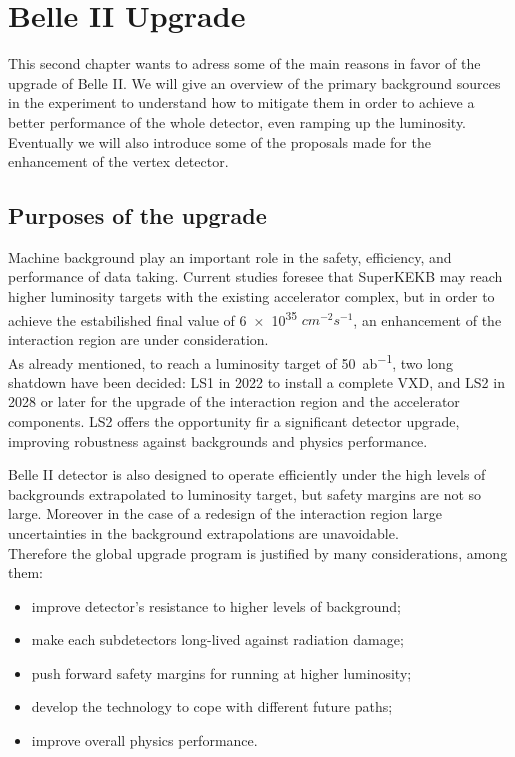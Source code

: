 \chapter{Belle II Upgrade} \label{ch:upgrade}

This second chapter wants to adress some of the main reasons in favor of the upgrade of Belle II. We will give an overview of the primary background sources in the experiment to understand how to mitigate them in order to achieve a better performance of the whole detector, even ramping up the luminosity. Eventually we will also introduce some of the proposals made for the enhancement of the vertex detector.



\section{Purposes of the upgrade}

Machine background play an important role in the safety, efficiency, and performance of data taking. 
Current studies foresee that SuperKEKB may reach higher luminosity targets with the existing accelerator complex, but in order to achieve the estabilished final value of  \num{6e35} $cm^{-2} s^{-1}$, an enhancement of the interaction region are under consideration.\\
As already mentioned, to reach a luminosity target of \SI{50}{ab^{-1}}, two long shatdown have been decided: LS1 in 2022 to install a complete VXD, and LS2 in 2028 or later for the upgrade of the interaction region and the accelerator components. LS2 offers the opportunity fir a significant detector upgrade, improving robustness against backgrounds and physics performance.

Belle II detector is also designed to operate efficiently under the high levels of backgrounds extrapolated to luminosity target, but safety margins are not so large. Moreover in the case of a redesign of the interaction region large uncertainties in the background extrapolations are unavoidable. \\
Therefore the global upgrade program is justified by many considerations, among them:

\begin{itemize}
\item improve detector's resistance to higher levels of background;
\item make each subdetectors long-lived against radiation damage;
\item push forward safety margins for running at higher luminosity;
\item develop the technology to cope with different future paths;
\item improve overall physics performance.
\end{itemize}


